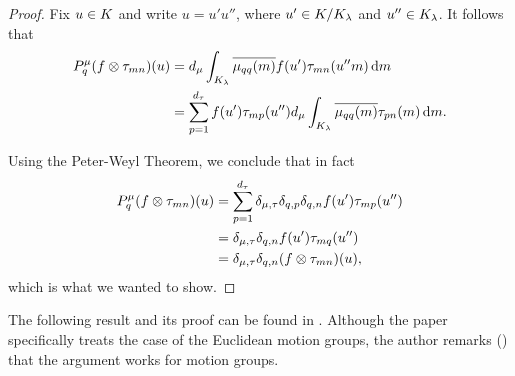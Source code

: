 \begin{proof}
    Fix $u \in K$ and write $u = u' u''$,
    where $u' \in {{K} \slash{} {{{K}_{\lambda}}}}$
    and $u'' \in {{K}_{\lambda}}$.
    It follows that
    \begin{align*}
        P^\mu_q (f \otimes \tau_{m n}) (u)
        &= {d_{\mu}}
            \int_{{K}_{\lambda}}
                \overline{\mu_{q q}(m)}
                f(u')
                \tau_{m n}(u'' m)
            \,\mathrm{d} m\\
        &= \sum_{p = 1}^{d_{\tau}}
                f(u')
                \tau_{m p}(u'')
                {d_{\mu}}
                \int_{{K}_{\lambda}}
                    \overline{\mu_{q q}(m)}
                    \tau_{p n}(m)
                \,\mathrm{d} m.
    \end{align*}

    Using the Peter-Weyl Theorem, we conclude that in fact
    \begin{align*}
        P^\mu_q (f \otimes \tau_{m n}) (u)
        &= \sum_{p = 1}^{d_{\tau}}
            \delta_{\mu,\tau}
            \delta_{q,p}
            \delta_{q,n}
            f(u')
            \tau_{m p}(u'')\\
        &= \delta_{\mu,\tau}
            \delta_{q,n}
            f(u')
            \tau_{m q}(u'')\\
        &= \delta_{\mu,\tau}
            \delta_{q,n}
            (f \otimes \tau_{m n})(u),
    \end{align*}
    which is what we wanted to show.
\end{proof}

The following result and its proof can be found in \cite[Theorem 1.1, 1.2, 1.3]{Ito52}.
Although the paper specifically treats the case of the Euclidean motion groups,
the author remarks (\cite[Remark p. 84]{Ito52}) that the argument works for motion groups.

